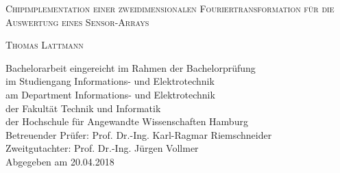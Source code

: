 \begin{titlepage}
 \begin{center}

{\scshape\Large Chipimplementation einer zweidimensionalen Fouriertransformation für die Auswertung eines
Sensor-Arrays}

\vspace{1cm}

{\scshape\Large Thomas Lattmann}

\end{center}

\vfill

\noindent Bachelorarbeit eingereicht im Rahmen der Bachelorprüfung\\ 
im Studiengang Informations- und Elektrotechnik\\
am Department Informations- und Elektrotechnik\\
der Fakultät Technik und Informatik\\
der Hochschule für Angewandte Wissenschaften Hamburg\\

\vspace{0.5cm}
\noindent Betreuender Prüfer: Prof. Dr.-Ing. Karl-Ragmar Riemschneider\\
Zweitgutachter: Prof. Dr.-Ing. Jürgen Vollmer\\

\vspace{0.5cm}
\noindent Abgegeben am 20.04.2018

\addtocounter{page}{-1}

\end{titlepage}
 \restoregeometry